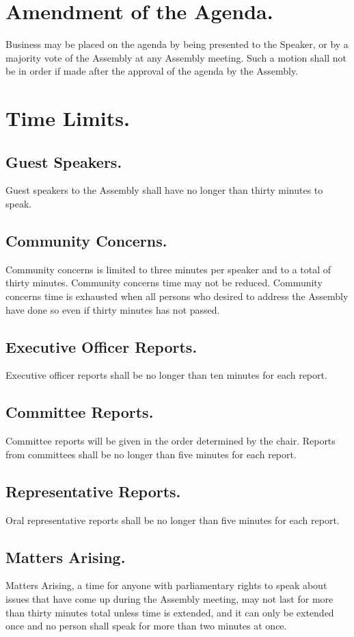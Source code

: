 \documentclass{rules}
\begin{document}
\section{Amendment of the Agenda.}
Business may be placed on the agenda by being presented to the Speaker, or by a majority vote of the Assembly at any Assembly meeting.  Such a motion shall not be in order if made after the approval of the agenda by the Assembly.

\section{Time Limits.}
\subsection{Guest Speakers.}
Guest speakers to the Assembly shall have no longer than thirty minutes to speak.
\subsection{Community Concerns.}
Community concerns is limited to three minutes per speaker and to a total of thirty minutes. Community concerns time may not be reduced.  Community concerns time is exhausted when all persons who desired to address the Assembly have done so even if thirty minutes has not passed.
\subsection{Executive Officer Reports.}
Executive officer reports shall be no longer than ten minutes for each report.
\subsection{Committee Reports.}
Committee reports will be given in the order determined by the chair.  Reports from committees shall be no longer than five minutes for each report.
\subsection{Representative Reports.}
Oral representative reports shall be no longer than five minutes for each report.
\subsection{Matters Arising.}
Matters Arising, a time for anyone with parliamentary rights to speak about issues that have come up during the Assembly meeting, may not last for more than thirty minutes total unless time is extended, and it can only be extended once and no person shall speak for more than two minutes at once.
\end{document}
